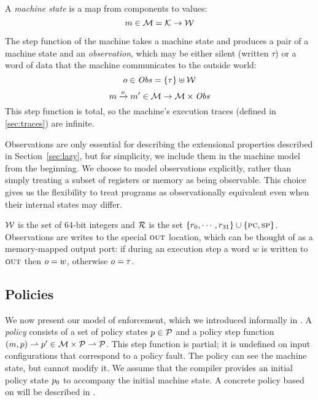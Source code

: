 \documentclass[acmsmall,review,anonymous]{acmart}\settopmatter{printfolios=true,printccs=false,printacmref=false}
\begin{document}
A {\em machine state} is a map from components to values:
%
\[\mach \in \MACHS = \COMPONENTS \rightarrow \WORDS\]

The step function of the machine takes a machine state and produces a
pair of a machine state and an {\em observation}, which may be either
silent (written \(\tau\)) or a word of data that the machine
communicates to the outside world:
\ifaftersubmission{}\fi
%
\[\obs \in \OBSS = \{\tau\} \uplus \WORDS\]
\[\mach \stepstoobs[\obs] \mach' \in \MACHS \rightarrow \MACHS \times \OBSS \]
%
This step function is total, so the machine's execution traces
(defined in \cref{sec:traces}) are infinite.

Observations are only essential for describing the extensional properties
described in Section~\ref{sec:lazy}, but for simplicity, we include them
in the machine model from the beginning.
We choose to model observations explicitly, rather than simply treating
a subset of registers or memory as being observable.  This choice gives
us the flexibility to treat programs as observationally equivalent even when
their internal states may differ.

$\WORDS$ is the
set of 64-bit integers and $\REGS$ is the set $\{r_0, \cdots, r_{31}\}
\cup \{\PCname,\SP\}$. Observations are writes to the
special $\rout$ location\ifaftersubmission{}\fi, which can be thought of as a memory-mapped
  output port: if during an execution step a word $w$ is
written to $\rout$ then $\obs = w$, otherwise $\obs = \tau$.

\subsection{Policies}

We now present our model of enforcement, which we introduced informally in .
A {\em policy} consists of a set of policy
states \(\pol \in \POLS\) and a policy step function \((\mach, \pol) \polstep \pol' \in
\MACHS \times \POLS \rightharpoonup \POLS\). This step function is partial;
it is undefined on input configurations that correspond to a policy fault. The policy
can see the machine state, but cannot modify it. We assume that the
compiler provides an initial policy state \(\pol_0\) to accompany the initial machine state.
%
A concrete policy based on \citet{DBLP:conf/sp/RoesslerD18} will be described in
.
\end{document}
